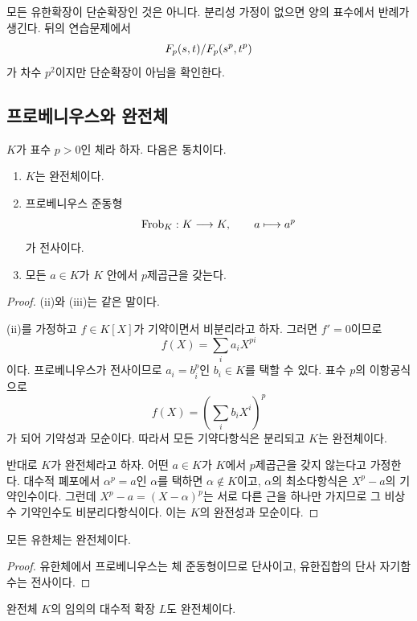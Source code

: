 \begin{pitfall}
모든 유한확장이 단순확장인 것은 아니다. 분리성 가정이 없으면 양의 표수에서 반례가 생긴다. 뒤의 연습문제에서
\[
  F_p(s,t)/F_p(s^p,t^p)
\]
가 차수 $p^2$이지만 단순확장이 아님을 확인한다.
\end{pitfall}

\subsection{프로베니우스와 완전체}

\begin{theorem}
$K$가 표수 $p>0$인 체라 하자. 다음은 동치이다.
\begin{enumerate}[label=(\roman*)]
  \item $K$는 완전체이다.
  \item 프로베니우스 준동형
  \[
    \operatorname{Frob}_K:K\longrightarrow K,
    \qquad a\longmapsto a^p
  \]
  가 전사이다.
  \item 모든 $a\in K$가 $K$ 안에서 $p$제곱근을 갖는다.
\end{enumerate}
\end{theorem}

\begin{proof}
(ii)와 (iii)는 같은 말이다.

(ii)를 가정하고 $f\in K[X]$가 기약이면서 비분리라고 하자. 그러면 $f'=0$이므로
\[
  f(X)=\sum_i a_iX^{pi}
\]
이다. 프로베니우스가 전사이므로 $a_i=b_i^p$인 $b_i\in K$를 택할 수 있다. 표수 $p$의 이항공식으로
\[
  f(X)=\left(\sum_i b_iX^i\right)^p
\]
가 되어 기약성과 모순이다. 따라서 모든 기약다항식은 분리되고 $K$는 완전체이다.

반대로 $K$가 완전체라고 하자. 어떤 $a\in K$가 $K$에서 $p$제곱근을 갖지 않는다고 가정한다. 대수적 폐포에서 $\alpha^p=a$인 $\alpha$를 택하면 $\alpha\notin K$이고, $\alpha$의 최소다항식은 $X^p-a$의 기약인수이다. 그런데 $X^p-a=(X-\alpha)^p$는 서로 다른 근을 하나만 가지므로 그 비상수 기약인수도 비분리다항식이다. 이는 $K$의 완전성과 모순이다.
\end{proof}

\begin{corollary}
모든 유한체는 완전체이다.
\end{corollary}

\begin{proof}
유한체에서 프로베니우스는 체 준동형이므로 단사이고, 유한집합의 단사 자기함수는 전사이다.
\end{proof}

\begin{proposition}
완전체 $K$의 임의의 대수적 확장 $L$도 완전체이다.
\end{proposition}


